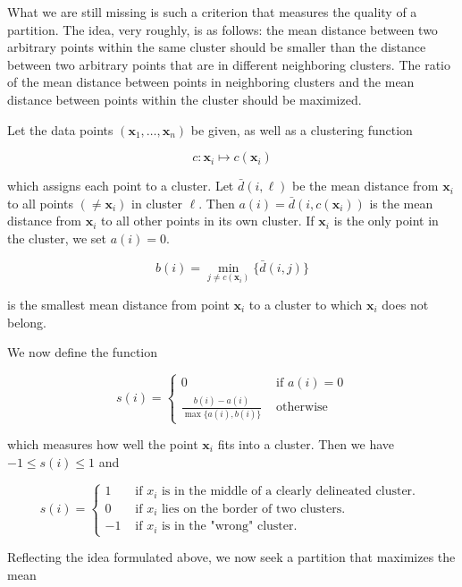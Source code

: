 \documentclass[10pt]{book}
\begin{document}
What we are still missing is such a criterion that measures the quality of a partition. The idea, very roughly, is as follows: the mean distance between two arbitrary points within the same cluster should be smaller than the distance between two arbitrary points that are in different neighboring clusters. The ratio of the mean distance between points in neighboring clusters and the mean distance between points within the cluster should be maximized.

Let the data points $\left(\boldsymbol{x}_{1}, \ldots, \boldsymbol{x}_{n}\right)$ be given, as well as a clustering function

$$
c: \boldsymbol{x}_{i} \mapsto c\left(\boldsymbol{x}_{i}\right)
$$

which assigns each point to a cluster. Let $\bar{d}(i, \ell)$ be the mean distance from $\boldsymbol{x}_{i}$ to all points $\left(\neq \boldsymbol{x}_{i}\right)$ in cluster $\ell$. Then $a(i)=\bar{d}\left(i, c\left(\boldsymbol{x}_{i}\right)\right)$ is the mean distance from $\boldsymbol{x}_{i}$ to all other points in its own cluster. If $\boldsymbol{x}_{i}$ is the only point in the cluster, we set $a(i)=0$.

$$
b(i)=\min _{j \neq c\left(\boldsymbol{x}_{i}\right)}\{\bar{d}(i, j)\}
$$

is the smallest mean distance from point $\boldsymbol{x}_{i}$ to a cluster to which $\boldsymbol{x}_{i}$ does not belong.

We now define the function

$$
s(i)=\left\{\begin{array}{cc}
0 & \text { if } a(i)=0 \\
\frac{b(i)-a(i)}{\max \{a(i), b(i)\}} & \text { otherwise }
\end{array}\right.
$$

which measures how well the point $\boldsymbol{x}_{i}$ fits into a cluster. Then we have $-1 \leq s(i) \leq 1$ and

$$
s(i)= \begin{cases}1 & \text { if } x_{i} \text { is in the middle of a clearly delineated cluster. } \\ 0 & \text { if } x_{i} \text { lies on the border of two clusters. } \\ -1 & \text { if } x_{i} \text { is in the "wrong" cluster. }\end{cases}
$$

Reflecting the idea formulated above, we now seek a partition that maximizes the mean
\end{document}
